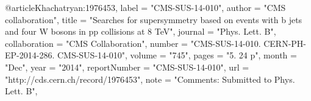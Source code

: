 @article{Khachatryan:1976453,
      label          = "CMS-SUS-14-010",
      author        = "{CMS collaboration}",
      title         = "{Searches for supersymmetry based on events with b jets
                       and four W bosons in pp collisions at 8 TeV}",
      journal       = "Phys. Lett. B",
      collaboration = "CMS Collaboration",
      number        = "CMS-SUS-14-010. CERN-PH-EP-2014-286. CMS-SUS-14-010",
      volume        = "745",
      pages         = "5. 24 p",
      month         = "Dec",
      year          = "2014",
      reportNumber  = "CMS-SUS-14-010",
      url           = "http://cds.cern.ch/record/1976453",
      note          = "Comments: Submitted to Phys. Lett. B",
}


